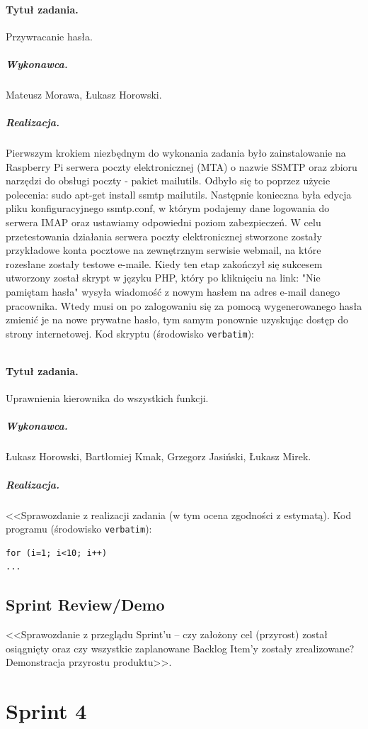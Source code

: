 \documentclass[a4paper]{article}
\begin{document}
\paragraph{Tytuł zadania.} Przywracanie hasła.
\subparagraph{Wykonawca.} Mateusz Morawa, Łukasz Horowski.
\subparagraph{Realizacja.} Pierwszym krokiem niezbędnym do wykonania zadania było zainstalowanie na Raspberry Pi serwera poczty elektronicznej (MTA) o nazwie SSMTP oraz zbioru narzędzi do obsługi poczty - pakiet mailutils. Odbyło się to poprzez użycie polecenia: sudo apt-get install ssmtp mailutils. Następnie konieczna była edycja pliku konfiguracyjnego ssmtp.conf, w którym podajemy dane logowania do serwera IMAP oraz ustawiamy odpowiedni poziom zabezpieczeń. W celu przetestowania działania serwera poczty elektronicznej stworzone zostały przykładowe konta pocztowe na zewnętrznym serwisie webmail, na które rozesłane zostały testowe e-maile. Kiedy ten etap zakończył się sukcesem utworzony został skrypt w języku PHP, który po kliknięciu na link: "Nie pamiętam hasła" wysyła wiadomość z nowym hasłem na adres e-mail danego pracownika. Wtedy musi on po zalogowaniu się za pomocą wygenerowanego hasła zmienić je na nowe prywatne hasło, tym samym ponownie uzyskując dostęp do strony internetowej.
Kod skryptu (środowisko \texttt{verbatim}): \begin{verbatim}

\end{verbatim}

\paragraph{Tytuł zadania.} Uprawnienia kierownika do wszystkich funkcji.
\subparagraph{Wykonawca.} Łukasz Horowski, Bartłomiej Kmak, Grzegorz Jasiński, Łukasz Mirek.
\subparagraph{Realizacja.} <<Sprawozdanie z realizacji zadania (w tym ocena zgodności z estymatą). Kod programu (środowisko \texttt{verbatim}): \begin{verbatim}
for (i=1; i<10; i++)
...
\end{verbatim}


\subsection{Sprint Review/Demo}
<<Sprawozdanie z przeglądu Sprint'u -- czy założony cel (przyrost) został osiągnięty oraz czy wszystkie zaplanowane Backlog Item'y zostały zrealizowane? Demonstracja przyrostu produktu>>.

\section{Sprint 4}
\end{document}
